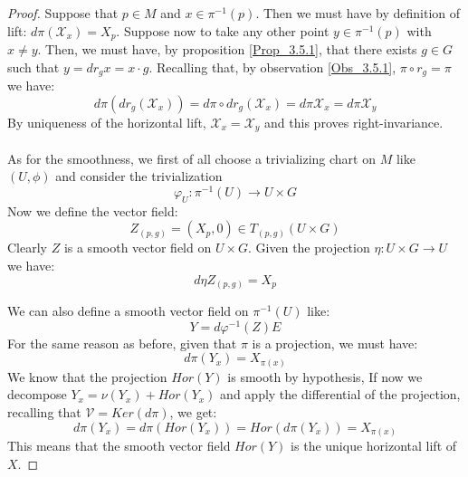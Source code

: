 \documentclass[12pt,a4paper]{report}
\theoremstyle{definition}
\theoremstyle{Theorem}
\theoremstyle{definition}
\theoremstyle{definition}
\begin{document}
	\begin{proof}
		Suppose that $p\in M$ and $x\in\pi^{-1}(p)$. Then we must have by definition of lift: $d\pi(\mathcal{X}_{x})=X_p$. Suppose now to take any other point $y\in\pi^{-1}(p)$ with $x\neq y$. Then, we must have, by proposition \ref{Prop_3.5.1}, that there exists $g\in G$ such that $y=dr_{g}x=x\cdot g$. Recalling that, by observation \ref{Obs_3.5.1}, $\pi\circ r_{g}=\pi$ we have:
		$$d\pi(dr_{g}(\mathcal{X}_{x}))=d\pi\circ dr_{g}(\mathcal{X}_{x})=d\pi\mathcal{X}_{x}=d\pi\mathcal{X}_{y}$$
		By uniqueness of the horizontal lift, $\mathcal{X}_{x}=\mathcal{X}_{y}$ and this proves right-invariance.\\
		\\
		As for the smoothness, we first of all choose a trivializing chart on $M$ like $(U,\phi)$ and consider the trivialization 
		$$\varphi_U:\pi^{-1}(U)\rightarrow U\times G$$
		Now we define the vector field:
		$$Z_{(p,g)}=(X_p,0)\in T_{(p,g)}(U\times G)$$
		Clearly $Z$ is a smooth vector field on $U\times G$. Given the projection $\eta:U\times G\rightarrow U$ we have:
		$$d\eta Z_{(p,g)}=X_p$$
		\begin{comment}
			To see this, note that $d\eta:T(U\times G)\rightarrow TU$ and so we get: $d\eta(Z)\in TU$ is a vector field. In particular, by definition of differential, we must have for any $(p,g)\in U\times G$:
			$$d\eta_{(p,g)}(Z_{(p,g)})f=Z_{(p,g)}(f\circ \eta_{(p,g)})$$
			And since $\eta$ projects the points from $U\times G$ to $U$, we get:
			$$d\eta_{(p,g)}(Z_{(p,g)})=X_p$$
		\end{comment}
		We can also define a smooth vector field on $\pi^{-1}(U)$ like:
		$$Y=d\varphi^{-1}(Z)E$$
		For the same reason as before, given that $\pi$ is a projection, we must have:
		$$d\pi(Y_{x})=X_{\pi(x)}$$
		We know that the projection $Hor(Y)$ is smooth by hypothesis, If now we decompose $Y_{x}=\nu(Y_{x})+Hor(Y_{x})$ and apply the differential of the projection, recalling that $\mathcal{V}=Ker(d\pi)$, we get:
		$$d\pi(Y_{x})=d\pi(Hor(Y_{x}))=Hor(d\pi(Y_{x}))=X_{\pi(x)}$$
		This means that the smooth vector field $Hor(Y)$ is the unique horizontal lift of $X$.
	\end{proof}
\end{document}
